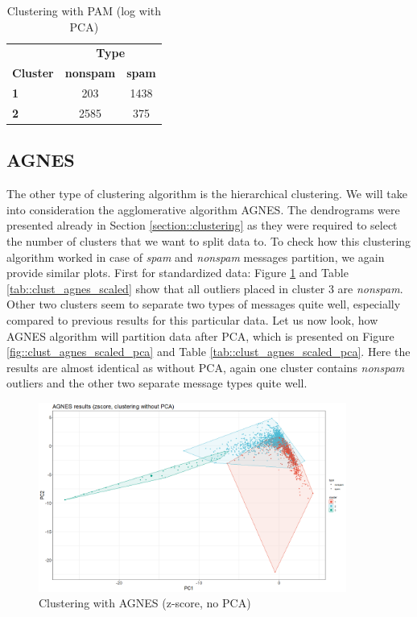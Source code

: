 \documentclass{article}
\begin{document}
	\begin{table}[h]
		\centering
		\begin{tabular}{lcc}
			& \multicolumn{2}{c}{\textbf{Type}} \\
			\textbf{Cluster} & \textbf{nonspam} & \textbf{spam} \\
			\textbf{1} & 203 & 1438 \\
			\textbf{2} & 2585 & 375 \\
		\end{tabular}
		\caption{Clustering with PAM (log with PCA)}
		\label{tab::clust_pam_log_pca}
	\end{table}
		
	\subsection{AGNES}
	The other type of clustering algorithm is the hierarchical clustering. We will take into consideration the agglomerative algorithm AGNES. The dendrograms were presented already in Section \ref{section::clustering} as they were required to select the number of clusters that we want to split data to. To check how this clustering algorithm worked in case of \textit{spam} and \textit{nonspam} messages partition, we again provide similar plots. First for standardized data: Figure \ref{fig::clust_agnes_scaled} and Table \ref{tab::clust_agnes_scaled} show that all outliers placed in cluster $3$ are \textit{nonspam}. Other two clusters seem to separate two types of messages quite well, especially compared to previous results for this particular data. Let us now look, how AGNES algorithm will partition data after PCA, which is presented on Figure \ref{fig::clust_agnes_scaled_pca} and Table \ref{tab::clust_agnes_scaled_pca}. Here the results are almost identical as without PCA, again one cluster contains \textit{nonspam} outliers and the other two separate message types quite well.
	
	\begin{figure}[h]
		\centering
		\includegraphics[width=0.9\textwidth]{proj2_plots/agnes_res_scaled.png}
		\caption{Clustering with AGNES (z-score, no PCA)}
		\label{fig::clust_agnes_scaled}
	\end{figure}
	 
\end{document}
